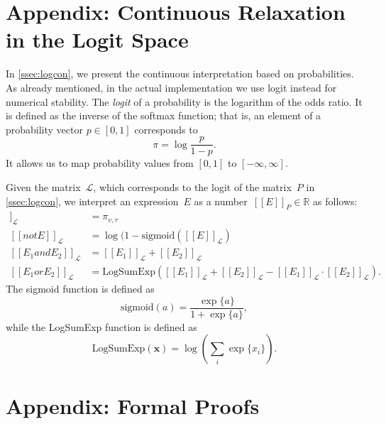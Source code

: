 \documentclass[acmsmall,nonacm]{acmart}\settopmatter{printfolios=true,printccs=false,printacmref=false}
\newcommand{\qqpi}[2]{[\![#2]\!]_{#1}}
\newcommand{\margincomment}[2]{\marginpar{\scriptsize\color{Maroon}#1 says: #2}}
\newcommand{\ivp}[1]{\margincomment{IVP}{#1}}
\begin{document}
\appendix
\section{Appendix: Continuous Relaxation in the Logit Space}\label{app:appendix-logit}

In \cref{ssec:logcon}, we present the continuous interpretation based on probabilities.
As already mentioned, in the actual implementation we use logit instead for numerical stability.
The \emph{logit} of a probability is the logarithm of the odds ratio.
It is defined as the inverse of the softmax function; that is, an element of a probability vector $p \in [0,1]$ corresponds to
\begin{equation*}
	\pi = \log \frac{p}{1 - p}.
\end{equation*}
It allows us to map probability values from $\left[ 0, 1 \right]$ to $\left[ -\infty, \infty \right]$.

Given the matrix~$\mathcal{L}$, which corresponds to the logit of the matrix~$P$ in \cref{ssec:logcon}, we interpret an expression~$E$ as a number~$\qqpi{P}{E} \in \mathbb{R}$ as  follows:
\begin{align*}
	\qqpi{\mathcal{L}}{x_v \mathrel{is} l_\tau} & = \pi_{v,\tau}                                                \\ \label{eq:logits}
	\qqpi{\mathcal{L}}{\mathrel{not} E}         & = \log(1-\text{sigmoid}(\qqpi{\mathcal{L}}{E})                \\
	\qqpi{\mathcal{L}}{E_1 \mathrel{and} E_2}   & = \qqpi{\mathcal{L}}{E_1} \mathrel{+} \qqpi{\mathcal{L}}{E_2} \\
	\qqpi{\mathcal{L}}{E_1 \mathrel{or} E_2}    & = \text{LogSumExp}(
	\qqpi{\mathcal{L}}{E_1} + \qqpi{\mathcal{L}}{E_2} - \qqpi{\mathcal{L}}{E_1} \cdot \qqpi{\mathcal{L}}{E_2}).
\end{align*}
The sigmoid function is defined as
\begin{equation*}
	\text{sigmoid}(a) = \frac{\exp\{a\}}{1 + \exp\{a\}},
\end{equation*}
while the LogSumExp function is defined as
\begin{equation*}
	\text{LogSumExp}(\bm{x}) = \log\left( \sum_i \exp\{x_i\} \right).
\end{equation*}

\section{Appendix: Formal Proofs}\label{app:proofs}
\end{document}
